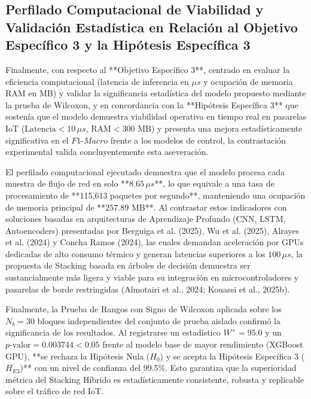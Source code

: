 \subsection{Perfilado Computacional de Viabilidad y Validación Estadística en Relación al Objetivo Específico 3 y la Hipótesis Específica 3}

Finalmente, con respecto al **Objetivo Específico 3**, centrado en evaluar la eficiencia computacional (latencia de inferencia en $\mu s$ y ocupación de memoria RAM en MB) y validar la significancia estadística del modelo propuesto mediante la prueba de Wilcoxon, y en concordancia con la **Hipótesis Específica 3** que sostenía que el modelo demuestra viabilidad operativa en tiempo real en pasarelas IoT ($\mathrm{Latencia} < 10\,\mu s$, $\mathrm{RAM} < 300\text{ MB}$) y presenta una mejora estadísticamente significativa en el $F1\text{-}Macro$ frente a los modelos de control, la contrastación experimental valida concluyentemente esta aseveración.

El perfilado computacional ejecutado demuestra que el modelo procesa cada muestra de flujo de red en solo **$8.65\,\mu s$**, lo que equivale a una tasa de procesamiento de **115,613 paquetes por segundo**, manteniendo una ocupación de memoria principal de **$257.89\text{ MB}$**. Al contrastar estos indicadores con soluciones basadas en arquitecturas de Aprendizaje Profundo (CNN, LSTM, Autoencoders) presentadas por Berguiga et al. (2025), Wu et al. (2025), Alrayes et al. (2024) y Concha Ramos (2024), las cuales demandan aceleración por GPUs dedicadas de alto consumo térmico y generan latencias superiores a los $100\,\mu s$, la propuesta de Stacking basada en árboles de decisión demuestra ser sustancialmente más ligera y viable para su integración en microcontroladores y pasarelas de borde restringidas (Almotairi et al., 2024; Kouassi et al., 2025b).

Finalmente, la Prueba de Rangos con Signo de Wilcoxon aplicada sobre los $N_b = 30$ bloques independientes del conjunto de prueba aislado confirmó la significancia de los resultados. Al registrarse un estadístico $W^+ = 95.0$ y un $p\text{-valor} = 0.003744 < 0.05$ frente al modelo base de mayor rendimiento (XGBoost GPU), **se rechaza la Hipótesis Nula ($H_0$) y se acepta la Hipótesis Específica 3 ($H_{E3}$)** con un nivel de confianza del 99.5\%. Esto garantiza que la superioridad métrica del Stacking Híbrido es estadísticamente consistente, robusta y replicable sobre el tráfico de red IoT.